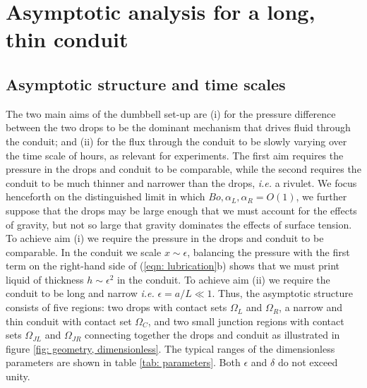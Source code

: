 \documentclass{jfm}
\begin{document}
 
\section{Asymptotic  analysis for a long, thin conduit  } \label{sec: times}

 \subsection{Asymptotic structure and time scales } \label{sec: time scales}

 
 
The two main aims of the dumbbell  set-up are 
(i) for the pressure difference between the two  drops to be the dominant mechanism that drives fluid through the conduit; and 
(ii) for the flux through the  conduit  to be slowly varying over the time scale of hours, as relevant for  experiments.
The first aim requires the pressure in the drops and  conduit  to be comparable,  while the second requires the  conduit  to be much thinner and narrower than the drops, {\it {i.e.}\ignorespaces} a rivulet. 
We focus  henceforth on the distinguished limit in which $Bo,\alpha_L,\alpha_R = O(1)$, we further suppose that the drops may be  large enough that we must account for the effects of gravity,  but not so large that gravity dominates the effects of  surface tension.
To achieve aim (i) we  require the pressure in the drops and conduit to be comparable.
In the conduit we   scale $ x \sim \epsilon$,   balancing  the pressure   with the first term on the right-hand side of  (\ref{eqn: lubrication}b) shows that we must print liquid of thickness  $ h \sim \epsilon^2 $ in the conduit.
To achieve aim (ii) we require the conduit to be long and narrow  {\it {i.e.}\ignorespaces}  $ \epsilon  = a/L \ll 1$.
Thus,  the  asymptotic  structure consists  of  five regions: two drops   with contact sets $\Omega_L$ and $\Omega_R$, a narrow and thin conduit with contact set $\Omega_C$, and two small junction regions with contact sets $\Omega_{JL}$ and $\Omega_{JR}$  connecting together the drops and conduit  as illustrated in  {f}igure  \ref{fig: geometry, dimensionless}. 
The typical ranges of the dimensionless parameters are shown in {t}able \ref{tab: parameters}.
Both $\epsilon$ and $\delta$ do not exceed unity.
\end{document}
